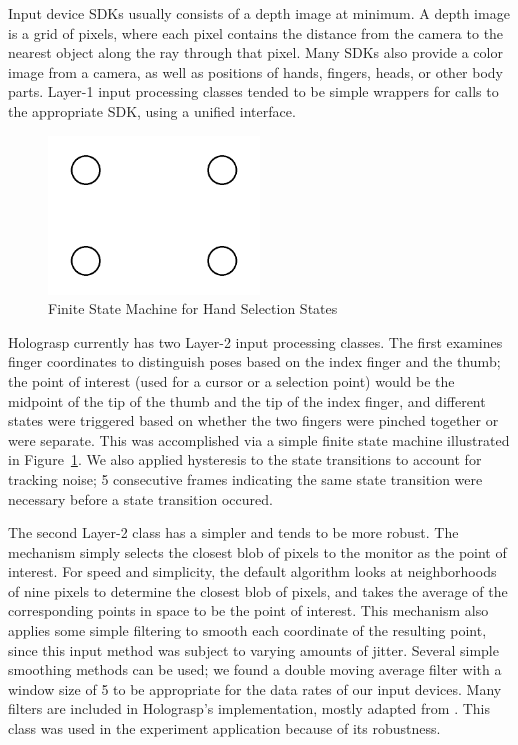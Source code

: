 \documentclass[pageno]{jpaper}
\begin{document}
Input device SDKs usually consists of a depth image at minimum. A depth image is a grid of pixels, where each
pixel contains the distance from the camera to the nearest object along the ray through that pixel. Many SDKs
also provide a color image from a camera, as well as positions of hands, fingers, heads, or other body parts.
Layer-1 input processing classes tended to be simple wrappers for calls to the appropriate SDK, using a unified
interface.

\begin{figure}
\centering
\includegraphics[width=0.5\textwidth]{figures/fsm.png}
\caption{Finite State Machine for Hand Selection States}
\label{fig:fsm}
\end{figure}
Holograsp currently has two Layer-2 input processing classes. The first examines finger coordinates to distinguish poses based
on the index finger and the thumb; the point of interest (used for a cursor or a selection point) would be the midpoint of the tip
of the thumb and the tip of the index finger, and different states were triggered based on whether the two fingers were pinched
together or were separate. This was accomplished via a simple finite state machine illustrated in Figure~\ref{fig:fsm}. We also
applied hysteresis to the state transitions to account for tracking noise; 5 consecutive frames indicating the same state transition
were necessary before a state transition occured.

The second Layer-2 class has a simpler and tends to be more robust. The mechanism simply selects the closest blob of pixels to the monitor
as the point of interest. For speed and simplicity, the default algorithm looks at neighborhoods of nine pixels to determine the closest blob of pixels,
and takes the average of the corresponding points in space to be the point of interest. This mechanism also applies some simple filtering to
smooth each coordinate of the resulting point, since this input method was subject to varying amounts of jitter. Several simple
smoothing methods can be used; we found a double moving average filter with a window size of 5 to be appropriate for the data rates of
our input devices. Many filters are included in Holograsp's implementation, mostly adapted from \cite{brown2004smoothing}. This class was
used in the experiment application because of its robustness.
\end{document}
